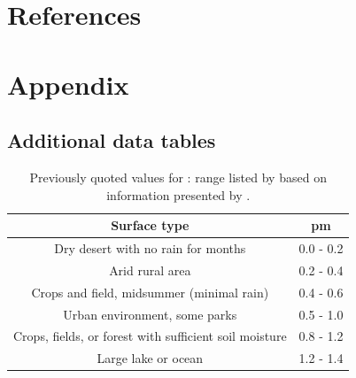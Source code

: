\documentclass[final,3p,times,authoryear]{elsarticle}
\begin{document}
\section*{References}\label{sec:ref}
   
  


\begin{thebibliography}{00}


\bibitem[ ()]{}

\end{thebibliography}


\appendix
\setcounter{table}{0}
\renewcommand{\thetable}{A\arabic{table}}



\section{Appendix}\label{sec:app}  
\subsection{Additional data tables}\label{app:tables}  


\begin{table}[!htbp]
\caption{Previously quoted values for : range listed by \cite{Hanna1992} based on information presented by \cite{Beljaars1991}.}  
\label{tab:surftype}
  \begin{tabular}{   c  c } 
	\hline  \textbf{Surface type} & \textbf{pm}  \\ \hline
	Dry desert with no rain for months & 0.0 - 0.2   \\ 
	Arid rural area & 0.2 - 0.4    \\ 
	Crops and field, midsummer (minimal rain) & 0.4 - 0.6   \\ 
	Urban environment, some parks & 0.5 - 1.0   \\ 
	Crops, fields, or forest with sufficient soil moisture & 0.8 - 1.2  \\ 
	Large lake or ocean & 1.2 - 1.4  \\ \hline	
  \end{tabular} 
\end{table}
\end{document}
